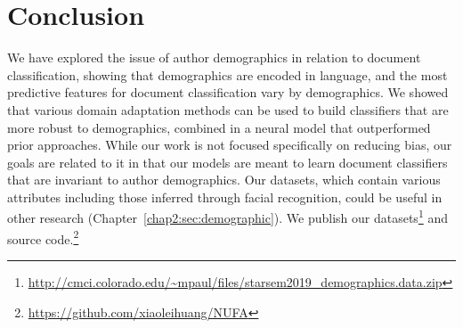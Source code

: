 \section{Conclusion}

We have explored the issue of author demographics in relation to document classification,
showing that demographics are encoded in language, and the most predictive features for document classification vary by demographics.
We showed that various domain adaptation methods can be used to build classifiers that are more robust to demographics, combined in a neural model that outperformed prior approaches.
While our work is not focused specifically on reducing bias,
our goals are related to it in that our models are meant to learn document classifiers that are invariant to author demographics.
Our datasets, which contain various attributes including those inferred through facial recognition, could be useful in other research (Chapter~\ref{chap2:sec:demographic}). We publish our datasets\footnote{\url{http://cmci.colorado.edu/~mpaul/files/starsem2019_demographics.data.zip}} and source code.\footnote{\url{https://github.com/xiaoleihuang/NUFA}}